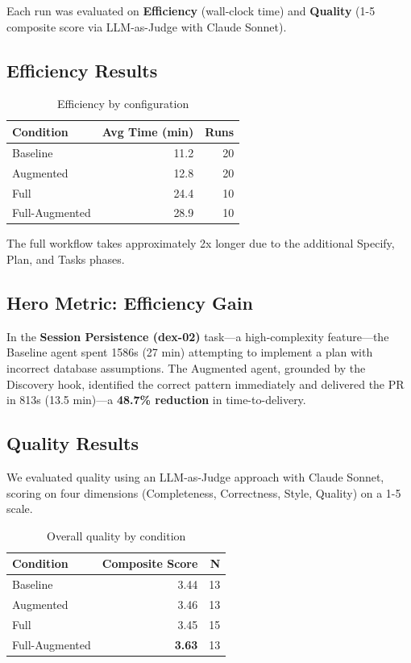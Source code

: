 \documentclass[sigconf,anonymous,review]{acmart}
\begin{document}
Each run was evaluated on \textbf{Efficiency} (wall-clock time) and \textbf{Quality} (1-5 composite score via LLM-as-Judge with Claude Sonnet).

\subsection{Efficiency Results}

\begin{table}[h]
  \centering
  \caption{Efficiency by configuration}
  \label{tab:efficiency}
  \begin{tabular}{lrr}
    \hline
    \textbf{Condition} & \textbf{Avg Time (min)} & \textbf{Runs} \\
    \hline
    Baseline & 11.2 & 20 \\
    Augmented & 12.8 & 20 \\
    Full & 24.4 & 10 \\
    Full-Augmented & 28.9 & 10 \\
    \hline
  \end{tabular}
\end{table}

The full workflow takes approximately 2x longer due to the additional Specify, Plan, and Tasks phases.

\subsection{Hero Metric: Efficiency Gain}

In the \textbf{Session Persistence (dex-02)} task---a high-complexity feature---the Baseline agent spent 1586s (27 min) attempting to implement a plan with incorrect database assumptions. The Augmented agent, grounded by the Discovery hook, identified the correct pattern immediately and delivered the PR in 813s (13.5 min)---a \textbf{48.7\% reduction} in time-to-delivery.

\subsection{Quality Results}

We evaluated quality using an LLM-as-Judge approach with Claude Sonnet, scoring on four dimensions (Completeness, Correctness, Style, Quality) on a 1-5 scale.

\begin{table}[h]
  \centering
  \caption{Overall quality by condition}
  \label{tab:quality}
  \begin{tabular}{lrr}
    \hline
    \textbf{Condition} & \textbf{Composite Score} & \textbf{N} \\
    \hline
    Baseline & 3.44 & 13 \\
    Augmented & 3.46 & 13 \\
    Full & 3.45 & 15 \\
    Full-Augmented & \textbf{3.63} & 13 \\
    \hline
  \end{tabular}
\end{table}
\end{document}
